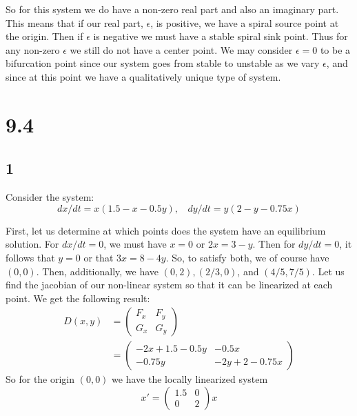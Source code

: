 \documentclass{article}
\theoremstyle{definition}
\begin{document}
        So for this system we do have a non-zero real part and also an imaginary part.
        This means that if our real part, $\epsilon$, is positive, we have a spiral source 
        point at the origin. Then if $\epsilon$ is negative we must have a stable spiral sink point.
        Thus for any non-zero $\epsilon$ we still do not have a center point. We may consider $\epsilon = 0$
        to be a bifurcation point since our system goes from stable to unstable as we vary $\epsilon$, 
        and since at this point we have a qualitatively unique type of system.
\section*{9.4}
    \subsection*{1}
        \begin{mdframed}[]
            Consider the system:
            \[
                dx/dt = x(1.5 - x - 0.5y), \ \ \ \ dy/dt = y(2 - y - 0.75x)
            \]
        \end{mdframed}
        First, let us determine at which points does the system have an equilibrium 
        solution. For $dx/dt = 0$, we must have $x = 0$ or $2x = 3 - y$. Then for 
        $dy/dt = 0$, it follows that $y = 0$ or that $3x= 8 - 4y$.
        So, to satisfy both, we of course have $(0,0)$. Then, additionally, we have 
        $(0,2), (2/3,0)$, and $(4/5, 7/5)$. Let us find the jacobian of our non-linear 
        system so that it can be linearized at each point. We get the following result:
        \begin{align*}   
            D(x,y) &= \begin{pmatrix}
                F_x & F_y \\
                G_x & G_y
            \end{pmatrix} \\
            &= \begin{pmatrix}
                -2x + 1.5 -0.5y & -0.5x \\
                -0.75y & -2y + 2  - 0.75x
            \end{pmatrix}
        \end{align*}
        So for the origin $(0,0)$ we have the locally linearized system 
        \[
            x' = \begin{pmatrix}
                1.5 & 0 \\
                0 & 2
            \end{pmatrix}x
        \]
\end{document}
